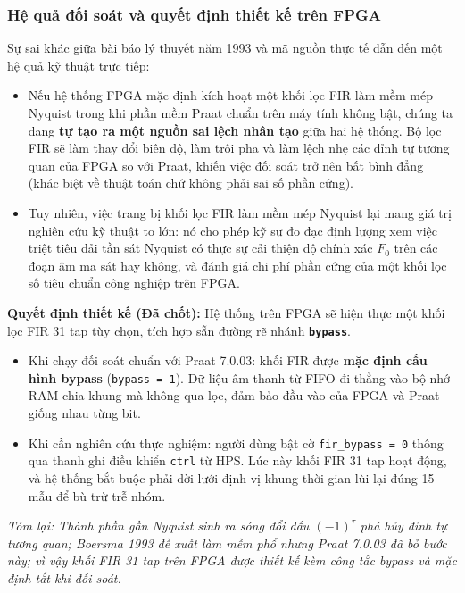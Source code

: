 \subsubsection*{Hệ quả đối soát và quyết định thiết kế trên FPGA}
Sự sai khác giữa bài báo lý thuyết năm 1993 và mã nguồn thực tế dẫn đến một hệ quả kỹ thuật trực tiếp:
\begin{itemize}[leftmargin=1.5em, itemsep=2pt]
    \item Nếu hệ thống FPGA mặc định kích hoạt một khối lọc FIR làm mềm mép Nyquist trong khi phần mềm Praat chuẩn trên máy tính không bật, chúng ta đang \textbf{tự tạo ra một nguồn sai lệch nhân tạo} giữa hai hệ thống. Bộ lọc FIR sẽ làm thay đổi biên độ, làm trôi pha và làm lệch nhẹ các đỉnh tự tương quan của FPGA so với Praat, khiến việc đối soát trở nên bất bình đẳng (khác biệt về thuật toán chứ không phải sai số phần cứng).
    \item Tuy nhiên, việc trang bị khối lọc FIR làm mềm mép Nyquist lại mang giá trị nghiên cứu kỹ thuật to lớn: nó cho phép kỹ sư đo đạc định lượng xem việc triệt tiêu dải tần sát Nyquist có thực sự cải thiện độ chính xác $F_0$ trên các đoạn âm ma sát hay không, và đánh giá chi phí phần cứng của một khối lọc số tiêu chuẩn công nghiệp trên FPGA.
\end{itemize}

\textbf{Quyết định thiết kế (Đã chốt):} Hệ thống trên FPGA sẽ hiện thực một khối lọc FIR 31 tap tùy chọn, tích hợp sẵn đường rẽ nhánh \textbf{\texttt{bypass}}. 
\begin{itemize}[leftmargin=1.5em, itemsep=2pt]
    \item Khi chạy đối soát chuẩn với Praat 7.0.03: khối FIR được \textbf{mặc định cấu hình bypass} (\texttt{bypass = 1}). Dữ liệu âm thanh từ FIFO đi thẳng vào bộ nhớ RAM chia khung mà không qua lọc, đảm bảo đầu vào của FPGA và Praat giống nhau từng bit.
    \item Khi cần nghiên cứu thực nghiệm: người dùng bật cờ \texttt{fir\_bypass = 0} thông qua thanh ghi điều khiển \texttt{ctrl} từ HPS. Lúc này khối FIR 31 tap hoạt động, và hệ thống bắt buộc phải dời lưới định vị khung thời gian lùi lại đúng 15 mẫu để bù trừ trễ nhóm.
\end{itemize}

\textit{Tóm lại: Thành phần gần Nyquist sinh ra sóng đổi dấu $(-1)^\tau$ phá hủy đỉnh tự tương quan; Boersma 1993 đề xuất làm mềm phổ nhưng Praat 7.0.03 đã bỏ bước này; vì vậy khối FIR 31 tap trên FPGA được thiết kế kèm công tắc bypass và mặc định tắt khi đối soát.}


